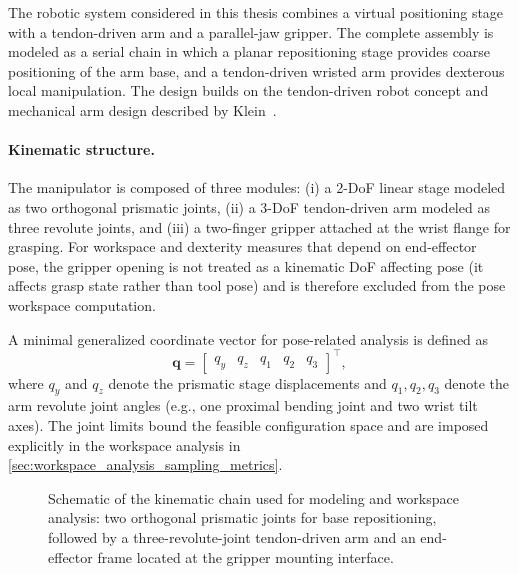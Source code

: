 The robotic system considered in this thesis combines a virtual positioning stage with a tendon-driven arm and a parallel-jaw gripper. The complete assembly is modeled as a serial chain in which a planar repositioning stage provides coarse positioning of the arm base, and a tendon-driven wristed arm provides dexterous local manipulation. The design builds on the tendon-driven robot concept and mechanical arm design described by Klein~\cite{Klein2023}.

\paragraph{Kinematic structure.}
The manipulator is composed of three modules:
(i) a 2-\ac{DoF} linear stage modeled as two orthogonal prismatic joints, (ii) a 3-\ac{DoF} tendon-driven arm modeled as three revolute joints, and (iii) a two-finger gripper attached at the wrist flange for grasping. For workspace and dexterity measures that depend on end-effector pose, the gripper opening is not treated as a kinematic \ac{DoF} affecting pose (it affects grasp state rather than tool pose) and is therefore excluded from the pose workspace computation.

A minimal generalized coordinate vector for pose-related analysis is defined as
\[
\mathbf{q} =
\begin{bmatrix}
q_y & q_z & q_1 & q_2 & q_3
\end{bmatrix}^{\top},
\]
where $q_y$ and $q_z$ denote the prismatic stage displacements and $q_1, q_2, q_3$ denote the arm revolute joint angles (e.g., one proximal bending joint and two wrist tilt axes). The joint limits bound the feasible configuration space and are imposed explicitly in the workspace analysis in \autoref{sec:workspace_analysis_sampling_metrics}.

\begin{figure}[ht!]
\centering
{}
\caption[Robot kinematic chain]{Schematic of the kinematic chain used for modeling and workspace analysis: two orthogonal prismatic joints for base repositioning, followed by a three-revolute-joint tendon-driven arm and an end-effector frame located at the gripper mounting interface.}\label{fig:robot_kinematic_chain}
\end{figure}

